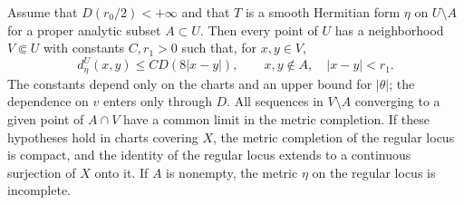 \begin{theorem}\label{thm:dini-current-distance}
Assume that $D(r_0/2)<+\infty$ and that $T$ is a smooth Hermitian form $\eta$ on $U\setminus A$ for a proper analytic subset $A\subset U$. Then every point of $U$ has a neighborhood $V\Subset U$ with constants $C,r_1>0$ such that, for $x,y\in V$,
\[
 d_\eta^U(x,y)\leq C D(8|x-y|),
 \qquad x,y\notin A,\quad |x-y|<r_1.
\]
The constants depend only on the charts and an upper bound for $|\theta|$; the dependence on $v$ enters only through $D$. All sequences in $V\setminus A$ converging to a given point of $A\cap V$ have a common limit in the metric completion. If these hypotheses hold in charts covering $X$, the metric completion of the regular locus is compact, and the identity of the regular locus extends to a continuous surjection of $X$ onto it. If $A$ is nonempty, the metric $\eta$ on the regular locus is incomplete.
\end{theorem}

